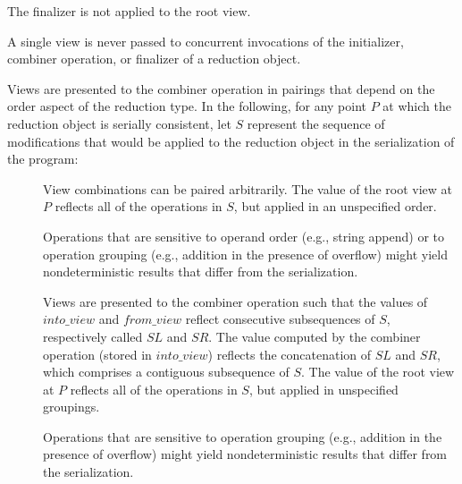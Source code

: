 The finalizer is not applied to the root view.

\begin{note}
A single view is never passed to concurrent invocations
of the initializer, combiner operation, or finalizer
of a reduction object.
\end{note}

\pnum
Views are presented to the combiner operation in pairings
that depend on the order aspect of the reduction type.
In the following,
for any point
$P$
at which the reduction object is serially consistent,
let
$S$
represent the sequence of modifications
that would be applied to the reduction object
in the serialization of the program:

\begin{description}
\item[]

View combinations can be paired arbitrarily.
The value of the root view at
$P$
reflects all of the operations in
$S$,
but applied in an unspecified order.

\begin{note}
Operations that are sensitive to operand order
(e.g., string append)
or to operation grouping
(e.g., addition in the presence of overflow)
might yield nondeterministic results that differ from the serialization.
\end{note}

\item[]

Views are presented to the combiner operation
such that the values of
$into\_view$
and
$from\_view$
reflect consecutive subsequences of
$S$,
respectively called
$SL$ and $SR$.
The value computed by the combiner operation
(stored in
$into\_view$)
reflects the concatenation of
$SL$ and $SR$,
which comprises a contiguous subsequence of
$S$.
The value of the root view at
$P$
reflects all of the operations in
$S$,
but applied in unspecified groupings.

\begin{note}
Operations that are sensitive to operation grouping
(e.g., addition in the presence of overflow)
might yield nondeterministic results that differ from the serialization. 
\end{note}

\begin{comment}
\item[\tcode{_Serial}]
\footnote{TODO:
Neither Cilk nor OpenMP provides this sort of guarantee.
Should CPLEX include it?
}
Views are presented to the combiner operation
such that the value of
$into\_view$
is the partial result reflecting an initial subsequence of
$S$,
called
$SL$,
and the value of
$from\_view$
is the partial result reflecting the next
(single) consecutive operation in
$S$
following
$SL$.
Thus, modifications are made to a single view
(ultimately the root view)
in the same order as for the serialization.


\end{comment}
\end{description}
